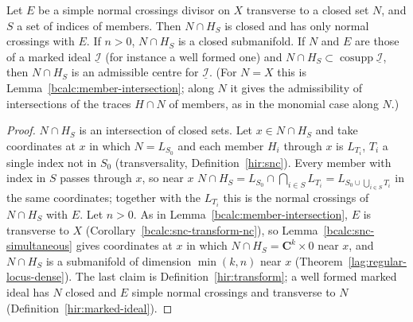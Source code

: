 \begin{lemma}
\label{bcalc:member-intersection-along}
\mixedleanok
Let \(E\) be a simple normal crossings divisor on \(X\) transverse to a closed set \(N\), and \(S\) a set of indices of members. Then
\(N\cap H_S\) is closed and has only normal crossings with \(E\). If \(n>0\), \(N\cap H_S\) is a closed submanifold. If \(N\) and \(E\) are those of a
marked ideal \(\underline{\mathcal I}\) (for instance a well formed one) and \(N\cap H_S\subset\operatorname{cosupp}\underline{\mathcal I}\), then \(N\cap H_S\) is an
admissible centre for \(\underline{\mathcal I}\). (For \(N=X\) this is Lemma~\ref{bcalc:member-intersection}; along \(N\) it gives the admissibility of
intersections of the traces \(H\cap N\) of members, as in the monomial case along \(N\).)
\end{lemma}
\begin{proof}
\mixedleanok
\(N\cap H_S\) is an intersection of closed sets. Let \(x\in N\cap H_S\) and take coordinates at \(x\) in which \(N=L_{S_0}\) and each member \(H_i\)
through \(x\) is \(L_{T_i}\), \(T_i\) a single index not in \(S_0\) (transversality, Definition~\ref{hir:snc}). Every member with index in \(S\) passes
through \(x\), so near \(x\) \(N\cap H_S=L_{S_0}\cap\bigcap_{i\in S}L_{T_i}=L_{S_0\cup\bigcup_{i\in S}T_i}\) in the same coordinates; together with the
\(L_{T_i}\) this is the normal crossings of \(N\cap H_S\) with \(E\). Let \(n>0\). As in Lemma~\ref{bcalc:member-intersection}, \(E\) is transverse to
\(X\) (Corollary~\ref{bcalc:snc-transform-nc}), so Lemma~\ref{bcalc:snc-simultaneous} gives coordinates at \(x\) in which \(N\cap H_S=\mathbf C^{k}\times0\)
near \(x\), and \(N\cap H_S\) is a submanifold of dimension \(\min(k,n)\) near \(x\) (Theorem~\ref{lag:regular-locus-dense}). The last claim is
Definition~\ref{hir:transform}; a well formed marked ideal has \(N\) closed and \(E\) simple normal crossings and transverse to \(N\)
(Definition~\ref{hir:marked-ideal}).
\end{proof}

